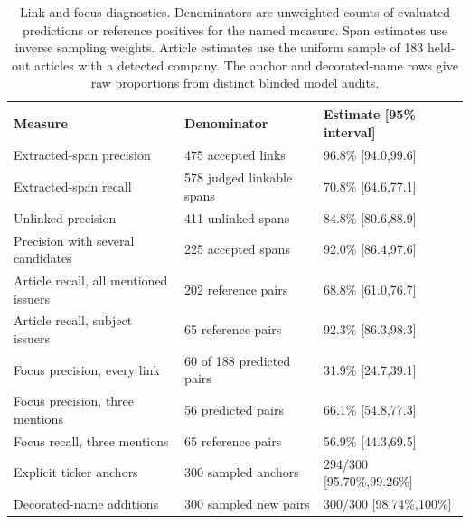 \begin{table}[t]
  \centering
  \small
  \caption{Link and focus diagnostics. Denominators are unweighted counts
    of evaluated predictions or reference positives for the named measure.
    Span estimates use inverse sampling weights. Article estimates use
    the uniform sample of 183 held-out articles with a detected company. The
    anchor and decorated-name rows
  give raw proportions from distinct blinded model audits.}
  \label{tab:app-links}
  \begin{tabular}{lll}
    \toprule
    Measure & Denominator & Estimate [95\% interval] \\
    \midrule
    Extracted-span precision & 475 accepted links & 96.8\% [94.0,99.6] \\
    Extracted-span recall & 578 judged linkable spans & 70.8\% [64.6,77.1] \\
    Unlinked precision & 411 unlinked spans & 84.8\% [80.6,88.9] \\
    Precision with several candidates & 225 accepted spans & 92.0\%
    [86.4,97.6] \\
    Article recall, all mentioned issuers & 202 reference pairs &
    68.8\% [61.0,76.7] \\
    Article recall, subject issuers & 65 reference pairs & 92.3\% [86.3,98.3] \\
    Focus precision, every link & 60 of 188 predicted pairs & 31.9\%
    [24.7,39.1] \\
    Focus precision, three mentions & 56 predicted pairs & 66.1\% [54.8,77.3] \\
    Focus recall, three mentions & 65 reference pairs & 56.9\% [44.3,69.5] \\
    Explicit ticker anchors & 300 sampled anchors & 294/300 [95.70\%,99.26\%] \\
    Decorated-name additions & 300 sampled new pairs & 300/300
    [98.74\%,100\%] \\
    \bottomrule
  \end{tabular}
\end{table}

